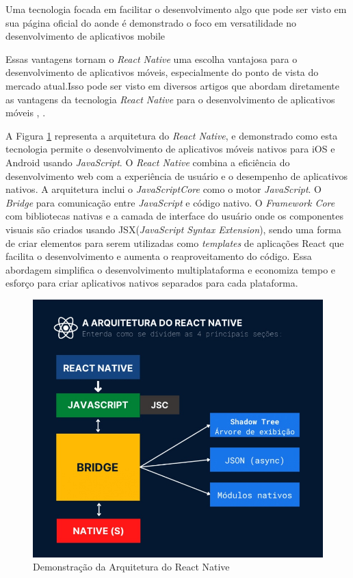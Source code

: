 \documentclass[
    12pt,                   %
    openright,              %
    oneside,                %
    a4paper,                %
    sumario=tradicional,    %
    english,                %
    brazil,                 %
    ]{abntex2}
\begin{document}
Uma tecnologia focada em facilitar o desenvolvimento algo que pode ser visto em sua página oficial do aonde é demonstrado o foco em versatilidade no desenvolvimento de aplicativos mobile  \cite{reactnative}

 Essas vantagens tornam o \textit{React Native} uma escolha vantajosa para o desenvolvimento de aplicativos móveis, especialmente do ponto de vista do mercado atual.Isso pode ser visto em diversos artigos que abordam diretamente as vantagens da tecnologia \textit{React Native} para o desenvolvimento de aplicativos móveis \cite{alura-dev-apps-mobile}, \cite{alura-react-native}. 

A Figura \ref{fig:arquitetura-react-native} representa a arquitetura do \textit{React Native}, e demonstrado como esta tecnologia permite o desenvolvimento de aplicativos móveis nativos para iOS e Android usando \textit{JavaScript}. O \textit{React Native} combina a eficiência do desenvolvimento web com a experiência de usuário e o desempenho de aplicativos nativos. A arquitetura inclui o \textit{JavaScriptCore} como o motor \textit{JavaScript}. O \textit{Bridge} para comunicação entre \textit{JavaScript} e código nativo. O \textit{Framework Core} com bibliotecas nativas e a camada de interface do usuário onde os componentes visuais são criados usando JSX(\textit{JavaScript Syntax Extension}), sendo uma forma de criar elementos para serem utilizadas como \textit{templates} de aplicações React que facilita o desenvolvimento e aumenta o reaproveitamento do código. Essa abordagem simplifica o desenvolvimento multiplataforma e economiza tempo e esforço para criar aplicativos nativos separados para cada plataforma.

\begin{figure}[!h]
  \begin{center}
  \centering
  \includegraphics[width=1\linewidth]{Imagens/arquitetura-react-native.jpg}
  \end{center}
  \caption[Imagem da Arquitetura do React Native]{ 
  Demonstração da Arquitetura do React Native}
  \label{fig:arquitetura-react-native}
\end{figure}
\end{document}
